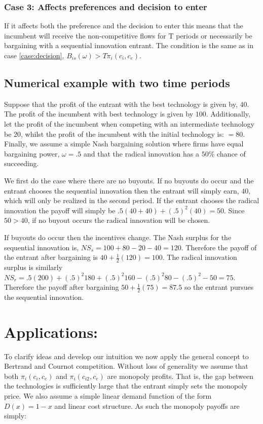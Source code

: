 \subsubsection{Case 3: Affects preferences and decision to enter}\label{case:both}

If it affects both the preference and the decision to enter this means that the incumbent will receive the non-competitive flows for T periods or necessarily be bargaining with a sequential innovation entrant. The condition is the same as in case \ref{case:decision}, $ B_{is}(\omega)>T \pi_i(c_i,c_e)$.

\subsection{Numerical example with two time periods}

Suppose that the profit of the entrant with the best technology is given by, $40$. The profit of the incumbent with best technology is given by $100$. Additionally, let the profit of the incumbent when competing with an intermediate technology be $20$, whilst the profit of the incumbent with the initial technology is: $=80$. Finally, we assume a simple Nash bargaining solution where firms have equal bargaining power, $\omega = .5$ and that the radical innovation has a $50$\% chance of succeeding. 

We first do the case where there are no buyouts. If no buyouts do occur and the entrant chooses the sequential innovation then the entrant will simply earn, $40$, which will only be realized in the second period. If the entrant chooses the radical innovation the payoff will simply be $.5(40+40)+(.5)^2(40)=50$. Since $50>40$, if no buyout occurs the radical innovation will be chosen. 

If buyouts do occur then the incentives change. The Nash surplus for the sequential innovation is, $NS_s = 100+80-20-40=120$. Therefore the payoff of the entrant after bargaining is $40+\frac{1}{2}(120)=100$. The radical innovation surplus is similarly $NS_r = .5(200)+(.5)^2 180+(.5)^2 160-(.5)^2 80-(.5)^2-50=75$. Therefore the payoff after bargaining $50+\frac{1}{2}(75)=87.5$ so the entrant pursues the sequential innovation. 

\section{Applications:}\label{application}

To clarify ideas and develop our intuition we now apply the general concept to Bertrand and Cournot competition. Without loss of generality we assume that both $\pi_i(c_i,c_e)$ and
$\pi_i(c_{i2},c_e)$ are monopoly profits. That is, the gap between the technologies is sufficiently large that the entrant simply sets the monopoly price. We also assume a simple linear demand function of the form $D(x)=1-x$ and linear cost structure.  As such the monopoly payoffs are simply: 

